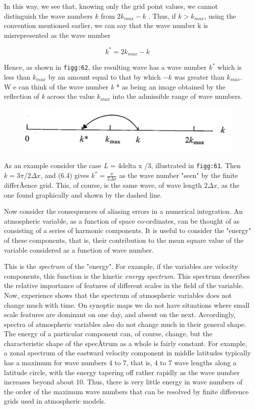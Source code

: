 In this way, we see that, knowing only the grid point values, we cannot
distinguish the wave numbers \(k\) from \(2k_{max} - k\) . Thus, if
\(k > k_{max}\), using the convention mentioned earlier, we can say that
the wave number k is misrepresented as the wave number

{\[k^{*} = 2k_{max} - k\]}

Hence, as shown in \texttt{figg:62}, the resulting wave has a wave
number \(k^{*}\) which is less than \(k_{max}\) by an amount equal to
that by which \(- k\) was greater than \( k_{max}\). W e can think of
the wave number \emph{k} * as being an image obtained by the reflection
of \emph{k} across the value \(k_{max}\) into the admissible range of
wave numbers.

\begin{figure}
\centering
\includegraphics[keepaspectratio]{figs/NM/pic62.jpg}
\caption{} \label{fig:}
\end{figure}

As an example consider the case \emph{L} = 4delta x /3, illustrated in
\texttt{figg:61}. Then \(k = 3\pi/2\Delta x\), and (6.4) gives
\(k^{*} = \frac{\pi}{2\Delta x}\) as the wave number "seen" by the
finite differÂ­ence grid. This, of course, is the same wave, of wave
length \(2\Delta x\), as the one found graphically and shown by the
dashed line.

Now consider the consequences of aliasing errors in a numerical
integration. An atmospheric variable, as a function of space
co-ordinates, can be thought of as consisting of a series of harmonic
components. It is useful to consider the "energy" of these components,
that is, their contribution to the mean square value of the variable
considered as a function of wave number.

This is the \emph{spectrum} of the "energy". For example, if the
variables are velocity components, this function is the kinetic
\emph{energy spectrum}. This spectrum describes the relative importance
of features of different scales in the field of the variable. Now,
experience shows that the spectrum of atmospheric variables does not
change much with time. On synoptic maps we do not have situations where
small scale features are dominant on one day, and absent on the next.
Accordingly, spectra of atmospheric variables also do not change much in
their general shape. The energy of a particular component can, of
course, change, but the characteristic shape of the specÂ­trum as a whole
is fairly constant. For example, a zonal spectrum of the eastward
velocity component in middle latitudes typically has a maximum for wave
numbers 4 to 7, that is, 4 to 7 wave lengths along a latitude circle,
with the energy tapering off rather rapidly as the wave number increases
beyond about 10. Thus, there is very little energy in wave numbers of
the order of the maximum wave numbers that can be resolved by finite
difference grids used in atmospheric models.

